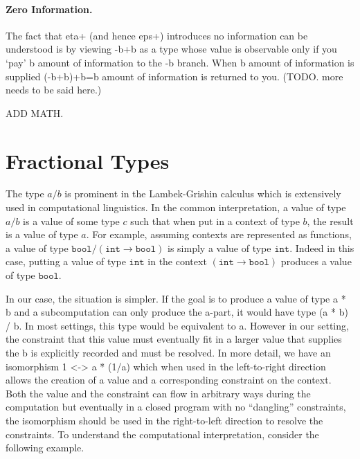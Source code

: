 \documentclass[preprint]{sigplanconf}
\begin{document}
{\paragraph*{Zero Information.}
The fact that {{eta+}} (and hence {{eps+}}) introduces no information
can be understood is by viewing {{-b+b}} as a type whose value is
observable only if you `pay' {{b}} amount of information to the {{-b}}
branch. When {{b}} amount of information is supplied {{(-b+b)+b=b}}
amount of information is returned to you. (TODO. more needs to be said
here.)

ADD MATH. 

\section{Fractional Types}
\label{sec:frac}

The type $a/b$ is prominent in the Lambek-Grishin calculus which is
extensively used in computational linguistics. In the common interpretation,
a value of type $a/b$ is a value of some type $c$ such that when put in a
context of type $b$, the result is a value of type $a$. For example, assuming
contexts are represented as functions, a value of type $\texttt{bool} /
(\texttt{int} \rightarrow \texttt{bool})$ is simply a value of type
$\texttt{int}$. Indeed in this case, putting a value of type $\texttt{int}$
in the context $(\texttt{int} \rightarrow \texttt{bool})$ produces a value of
type $\texttt{bool}$. 

In our case, the situation is simpler. If the goal is to produce a value of
type {{a * b}} and a subcomputation can only produce the {{a}}-part, it would
have type {{(a * b) / b}}. In most settings, this type would be equivalent to
{{a}}. However in our setting, the constraint that this value must eventually
fit in a larger value that supplies the {{b}} is explicitly recorded and must
be resolved. In more detail, we have an isomorphism {{ 1 <-> a * (1/a) }}
which when used in the left-to-right direction allows the creation of a value
and a corresponding constraint on the context.  Both the value and the
constraint can flow in arbitrary ways during the computation but eventually
in a closed program with no ``dangling'' constraints, the isomorphism should
be used in the right-to-left direction to resolve the constraints.  To
understand the computational interpretation, consider the following example.

}
\end{document}

